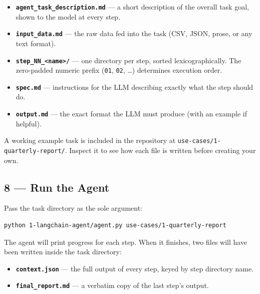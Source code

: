 \documentclass[12pt, a4paper]{article}
\begin{document}
\begin{itemize}[leftmargin=1.5em]
  \item \textbf{\texttt{agent\_task\_description.md}} — a short description of the overall task goal, shown to the model at every step.
  \item \textbf{\texttt{input\_data.md}} — the raw data fed into the task (CSV, JSON, prose, or any text format).
  \item \textbf{\texttt{step\_NN\_<name>/}} — one directory per step, sorted lexicographically. The zero-padded numeric prefix (\texttt{01}, \texttt{02}, \ldots) determines execution order.
  \item \textbf{\texttt{spec.md}} — instructions for the LLM describing exactly what the step should do.
  \item \textbf{\texttt{output.md}} — the exact format the LLM must produce (with an example if helpful).
\end{itemize}

\begin{notebox}
A working example task is included in the repository at \texttt{use-cases/1-quarterly-report/}. Inspect it to see how each file is written before creating your own.
\end{notebox}

\subsection{8 — Run the Agent}

Pass the task directory as the sole argument:

\begin{lstlisting}[style=shellstyle]
python 1-langchain-agent/agent.py use-cases/1-quarterly-report
\end{lstlisting}

The agent will print progress for each step. When it finishes, two files will have been written inside the task directory:

\begin{itemize}[leftmargin=1.5em]
  \item \textbf{\texttt{context.json}} — the full output of every step, keyed by step directory name.
  \item \textbf{\texttt{final\_report.md}} — a verbatim copy of the last step's output.
\end{itemize}
\end{document}
